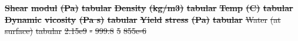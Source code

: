 \documentclass[preprint,12pt]{elsarticle}
\providecommand{\DIFdel}[1]{{\protect\color{red}\sout{#1}}}                      %
\begin{document}
\textbf{%
\DIFdel{Shear }%
\DIFdel{modul}%
\DIFdel{(Pa)}%
\DIFdel{tabular}%
} %
\textbf{%
\DIFdel{Density}%
\DIFdel{(kg/m3)}%
\DIFdel{tabular}%
} %
\textbf{%
\DIFdel{Temp}%
\DIFdel{(C)}%
\DIFdel{tabular}%
} %
\textbf{%
\DIFdel{Dynamic }%
\DIFdel{vicosity}%
\DIFdel{(Pa s)}%
\DIFdel{tabular}%
} %
\textbf{%
\DIFdel{Yield }%
\DIFdel{stress}%
\DIFdel{(Pa)}%
\DIFdel{tabular}%
} %
\DIFdel{Water}%
\DIFdel{(at surface)}%
\DIFdel{tabular}%
\DIFdel{2.15e9                                                                  }%
\DIFdel{-                                                                        }%
\DIFdel{999.8                                                              }%
\DIFdel{5                                                           }%
\DIFdel{855e-6                                                                        }%
\end{document}
